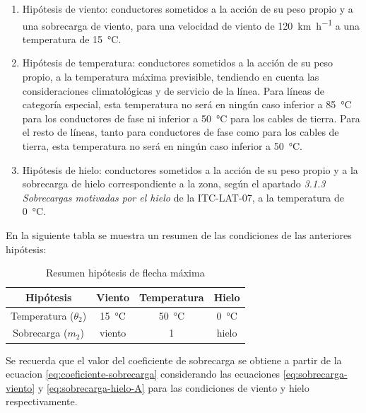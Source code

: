 \begin{enumerate}
    \item Hipótesis de viento: conductores sometidos a la acción de su peso propio y a una sobrecarga de viento, para una velocidad de viento de \SI{120}{\kilo\meter\per\hour} a una temperatura de \SI{15}{\celsius}.
    \item Hipótesis de temperatura: conductores sometidos a la acción de su peso propio, a la temperatura máxima previsible, tendiendo en cuenta las consideraciones climatológicas y de servicio de la línea. Para líneas de categoría especial, esta temperatura no será en ningún caso inferior a \SI{85}{\celsius} para los conductores de fase ni inferior a \SI{50}{\celsius} para los cables de tierra. Para el resto de líneas, tanto para conductores de fase como para los cables de tierra, esta temperatura no será en ningún caso inferior a \SI{50}{\celsius}.
    \item Hipótesis de hielo: conductores sometidos a la acción de su peso propio y a la sobrecarga de hielo correspondiente a la zona, según el apartado \textit{3.1.3 Sobrecargas motivadas por el hielo} de la ITC-LAT-07, a la temperatura de \SI{0}{\celsius}.
\end{enumerate}

En la siguiente tabla se muestra un resumen de las condiciones de las anteriores hipótesis:

\begin{table}[H]
\caption{Resumen hipótesis de flecha máxima}
\centering
\label{tab:hipotesis-fmax}
\begin{tabular}{|c|c|c|c|}
\hline
\rowcolor[HTML]{EFEFEF} 
\textbf{Hipótesis}       & \textbf{Viento}                                     & \textbf{Temperatura}                                & \textbf{Hielo}                                     \\ \hline
Temperatura ($\theta_2$) & \SI{15}{\celsius} & \SI{50}{\celsius} & \SI{0}{\celsius} \\ \hline
Sobrecarga ($m_2$)       & viento                                              & 1                                                   & hielo                                              \\ \hline
\end{tabular}
\end{table}

Se recuerda que el valor del coeficiente de sobrecarga se obtiene a partir de la ecuacion \eqref{eq:coeficiente-sobrecarga} considerando las ecuaciones \eqref{eq:sobrecarga-viento} y \eqref{eq:sobrecarga-hielo-A} para las condiciones de viento y hielo respectivamente.

